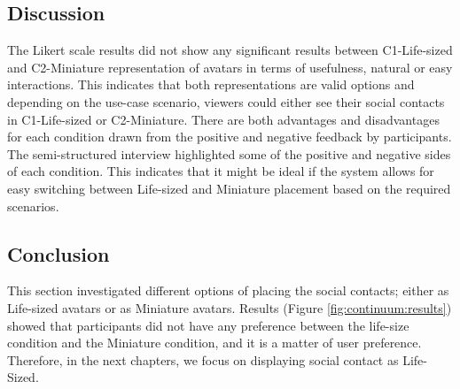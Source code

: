 \subsection{Discussion}




The Likert scale results did not show any significant results between C1-Life-sized and C2-Miniature representation of avatars in terms of usefulness, natural or easy interactions. This indicates that both representations are valid options and depending on the use-case scenario, viewers could either see their social contacts in C1-Life-sized or C2-Miniature. There are both advantages and disadvantages for each condition drawn from the positive and negative feedback by participants. The semi-structured interview highlighted some of the positive and negative sides of each condition. This indicates that it might be ideal if the system allows for easy switching between Life-sized and Miniature placement based on the required scenarios. 


\subsection{Conclusion}

This section investigated different options of placing the social contacts; either as Life-sized avatars or as Miniature avatars. Results (Figure \ref{fig:continuum:results}) showed that participants did not have any preference between the life-size condition and the Miniature condition, and it is a matter of user preference. Therefore, in the next chapters, we focus on displaying social contact as Life-Sized.

